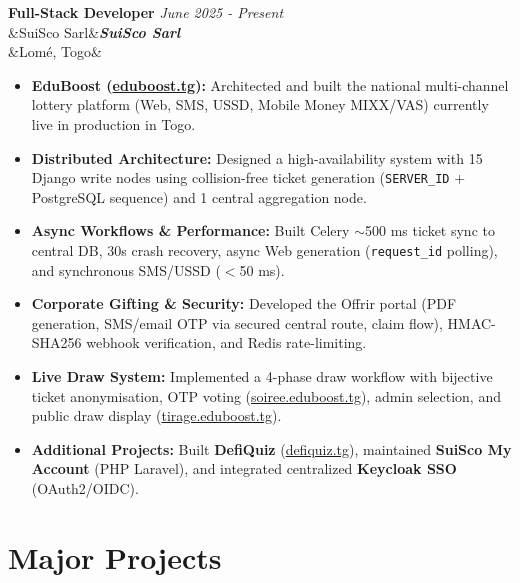 \documentclass[11pt, a4paper]{article}
\newcommand{\cventry}[4]{%
  \needspace{3\baselineskip}%
  \noindent\textbf{\large #1} \hfill {\small\color{secondary}\textit{#2}}\\[2pt]%
  \ifx&#3&\else\noindent\textbf{\textit{#3}}\\[3pt]\fi
  \ifx&#4&\else\noindent{#4}\fi
  \vspace{6pt}\par
}
\begin{document}
\cventry{Full-Stack Developer}{June 2025 - Present}{SuiSco Sarl}{Lom\'{e}, Togo}
\begin{itemize}
  \item \textbf{EduBoost (\href{https://www.eduboost.tg}{eduboost.tg}):} Architected and built the national multi-channel lottery platform (Web, SMS, USSD, Mobile Money MIXX/VAS) currently live in production in Togo.
  \item \textbf{Distributed Architecture:} Designed a high-availability system with 15 Django write nodes using collision-free ticket generation (\texttt{SERVER\_ID} + PostgreSQL sequence) and 1 central aggregation node.
  \item \textbf{Async Workflows \& Performance:} Built Celery $\sim$500 ms ticket sync to central DB, 30s crash recovery, async Web generation (\texttt{request\_id} polling), and synchronous SMS/USSD ($<$50 ms).
  \item \textbf{Corporate Gifting \& Security:} Developed the Offrir portal (PDF generation, SMS/email OTP via secured central route, claim flow), HMAC-SHA256 webhook verification, and Redis rate-limiting.
  \item \textbf{Live Draw System:} Implemented a 4-phase draw workflow with bijective ticket anonymisation, OTP voting (\href{https://soiree.eduboost.tg}{soiree.eduboost.tg}), admin selection, and public draw display (\href{https://tirage.eduboost.tg}{tirage.eduboost.tg}).
  \item \textbf{Additional Projects:} Built \textbf{DefiQuiz} (\href{https://defiquiz.tg/}{defiquiz.tg}), maintained \textbf{SuiSco My Account} (PHP Laravel), and integrated centralized \textbf{Keycloak SSO} (OAuth2/OIDC).
\end{itemize}

\section{Major Projects}
\end{document}
